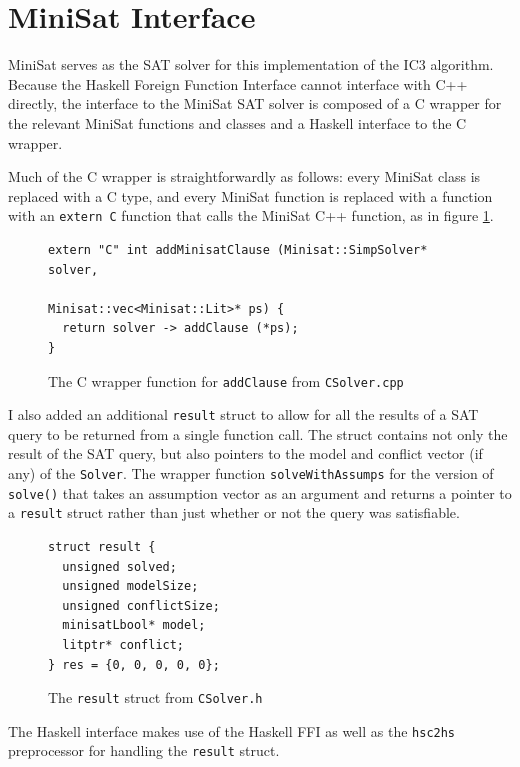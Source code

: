 \documentclass[12pt,a4paper,twoside,openright]{report}
\begin{document}
{\section{MiniSat Interface}

MiniSat serves as the SAT solver for this implementation of the IC3 algorithm.
Because the Haskell Foreign Function Interface cannot interface with C++ directly,
the interface to the MiniSat SAT solver is composed of a C wrapper for the relevant
MiniSat functions and classes and a Haskell interface to the C wrapper.

Much of the C wrapper is straightforwardly as follows: every MiniSat class is replaced with a C
type, and every MiniSat function is replaced with a function with an \verb,extern C, function that
calls the MiniSat C++ function, as in figure \ref{addClause}.

\begin{figure}[ht]
\begin{verbatim}
extern "C" int addMinisatClause (Minisat::SimpSolver* solver,
                                 Minisat::vec<Minisat::Lit>* ps) {
  return solver -> addClause (*ps);
}
\end{verbatim}
\caption{The C wrapper function for {\tt addClause} from {\tt CSolver.cpp}}
\label{addClause}
\end{figure}

I also added an additional \verb,result, struct to allow for all the results of a SAT query to
be returned from a single function call. The struct contains not only the result of the SAT
query, but also pointers to the model and conflict vector (if any) of the \verb,Solver,.
The wrapper function \verb,solveWithAssumps, for the version of \verb,solve(), that takes an assumption
vector as an argument and returns a pointer to a \verb,result, struct
rather than just whether or not the query was satisfiable.

\begin{figure}[ht]
\begin{verbatim}
struct result {
  unsigned solved;
  unsigned modelSize;
  unsigned conflictSize;
  minisatLbool* model;
  litptr* conflict;
} res = {0, 0, 0, 0, 0};
\end{verbatim}
\caption{The {\tt result} struct from {\tt CSolver.h}}
\end{figure}

The Haskell interface makes use of the Haskell FFI as well as the \verb,hsc2hs, preprocessor
for handling the \verb,result, struct.

}
\end{document}
